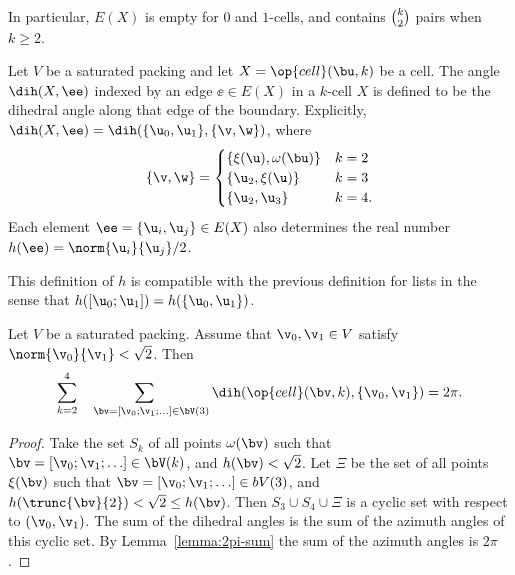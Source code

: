 In particular, $E(X)$ is empty for $0$ and $1$-cells, and contains
$\tbinom{k}{2}$ pairs when $k\ge 2$.

\begin{definition}[$\dih(X,\ee)$,~$h$] 
Let $V$ be a saturated packing and let $X = \op{cell}(\bu,k)$
be a cell.
The angle $\dih(X,\ee)$ indexed by an edge $\ee\in
E(X)$ in a $k$-cell $X$
is defined to be the dihedral angle along that edge of the
boundary.  Explicitly, $\dih(X,\ee)=\dih(\{\u_0,\u_1\},\{\v,\w\})$,
where 
\[
\{\v,\w\} = 
\begin{cases}
  \{\xi(\u),\omega(\bu) \} &  k=2\\
  \{\u_2,\xi(\u)\} & k=3\\
  \{\u_2,\u_3\} &k=4.
\end{cases}
\]
%
%
Each
element $\ee=\{ \u_i, \u_j\}\in E(X)$ also determines the real number
$h(\ee) = \norm{ \u_i}{ \u_j}/2$.
\end{definition}

This definition of $h$ is compatible with the previous definition for lists in the sense that
$h([\u_0;\u_1]) = h(\{\u_0,\u_1\})$.

\begin{lemma}
Let $V$ be a saturated packing.  Assume that $\v_0,\v_1\in V$ satisfy $\norm{\v_0}{\v_1}<\sqrt2$.
Then
\[
\sum_{k=2}^4 \sum_{~~~\bv=[\v_0;\v_1;\ldots]\in \bV(3)} \dih(\op{cell}(\bv,k),\{\v_0,\v_1\}) = 2\pi.
\]
\end{lemma}

\begin{proof} Take the set $S_k$ of all points $\omega(\bv)$ such that
  $\bv=[\v_0;\v_1;\ldots]\in \bV(k)$, and $h(\bv)<\sqrt2$.  Let $\Xi$
  be the set of all points $\xi(\bv)$ such that
  $\bv=[\v_0;\v_1;\ldots]\in bV(3)$, and $h(\trunc{\bv}{2})< \sqrt2\le
  h(\bv)$.  Then $S_3\cup S_4\cup \Xi$ is a cyclic set with respect to
  $(\v_0,\v_1)$.  The sum of the dihedral angles is the sum of the
  azimuth angles of this cyclic set.  By Lemma~\ref{lemma:2pi-sum} the
  sum of the azimuth angles is $2\pi$.
\end{proof}


